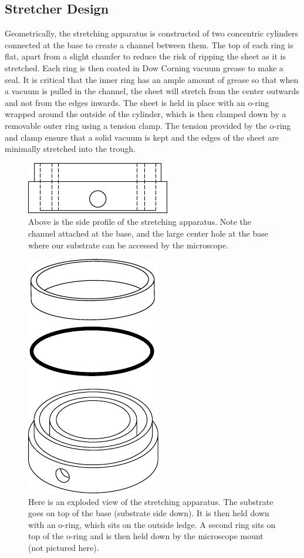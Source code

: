 \subsection{Stretcher Design}
Geometrically, the stretching apparatus is constructed of two concentric cylinders connected at the base to create a channel between them. The top of each ring is flat, apart from a slight chamfer to reduce the risk of ripping the sheet as it is stretched. Each ring is then coated in Dow Corning vacuum grease to make a seal. It is critical that the inner ring has an ample amount of grease so that when a vacuum is pulled in the channel, the sheet will stretch from the center outwards  and not from the edges inwards. The sheet is held in place with an o-ring wrapped around the outside of the cylinder, which is then clamped down by a removable outer ring using a tension clamp. The tension provided by the o-ring and clamp ensure that a solid vacuum is kept and the edges of the sheet are minimally stretched into the trough.
\begin{figure}[h!]
	\centering
	\includegraphics[width=0.6\linewidth]{Chapters/Figures/stretcher_side}
	\caption[Side Profile of Stretching Apparatus]{Above is the side profile of the stretching apparatus. Note the channel attached at the base, and the large center hole at the base where our substrate can be accessed by the microscope.}
	\label{fig:stretcherside}
\end{figure}

\begin{figure}[h!]
	\centering
	\includegraphics[width=.35\linewidth]{Chapters/Figures/exploded_stretcher}
	\caption[Stretching Apparatus Design]{Here is an exploded view of the stretching apparatus. The substrate goes on top of the base (substrate side down). It is then held down with an o-ring, which sits on the outside ledge. A second ring sits on top of the o-ring and is then held down by the microscope mount (not pictured here).}
	\label{fig:explodedstretcher}
\end{figure}


